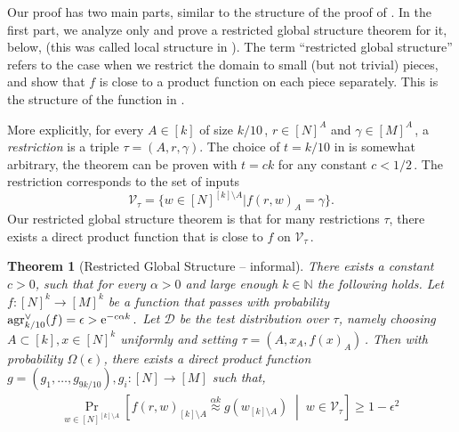 \documentclass[11pt]{article}
\numberwithin{equation}{section}
\newtheorem{theorem}{Theorem}[section]
\theoremstyle{definition}
\theoremstyle{plain}
\newcommand{\eee}{\mathrm e}
\newcommand{\Prob}[2][]{\Pr_{{#1}}\left[#2\right]} %
\newcommand{\brac}[1]{[#1]} %
\newcommand{\given}{\;\middle\vert\;} %
\newcommand\f{f} %
\newcommand{\g}{g} %
\newcommand\pf{g} %
\newcommand{\test}[2]{
	\ifx &#2&
	\textrm{agr}^{#1}
	\else	
	\textrm{agr}^{#1}_{#2}
	\fi}
\newcommand\neql[1]{\stackrel{{#1}}{ \approx}} %
\newcommand\cons{\mathcal{V}} %
\begin{document}
Our proof has two main parts, similar to the structure of the proof of \cite{dinur2008locally,impagliazzo2012new}. In the first part, we analyze only  and prove a restricted global structure theorem for it,  below, (this was called local structure in \cite{impagliazzo2012new,dinur2014direct}). The term ``restricted global structure'' refers to
the case %
when we restrict the domain to small (but not trivial) pieces, and show that $f$ is close to a product function on each piece separately. This is the structure of the function in .


More explicitly, for every $A\in[k]$ of size $k/10$\,, $r\in[N]^A$ and $\gamma\in[M]^A$\,, a \emph{restriction} is a triple $\tau = (A,r,\gamma)$. The choice of $t=k/10$ in  is somewhat arbitrary, the theorem can be proven with $t=ck$ for
any constant  %
%
%
$c < 1/2$\,.   %
The restriction corresponds to the set of inputs
%
\[\mathcal{V}_\tau = \{w\in [N]^{[k]\setminus A} | \f(r,w)_A = \gamma \}.\]
Our restricted global structure theorem is that for many restrictions $\tau$, 
there %
exists  %
a direct product function that is close to $\f$ on $\cons_{\tau}$\,.

\begin{theorem}[Restricted Global Structure -- informal] \label{thm:informal local}
	There exists a %
constant $c>0$, such that for every %
$\alpha>0$ and large enough $k\in\mathbb{N}$ the following holds.
Let $\f:[N]^k\rightarrow[M]^k$ be a function that passes  with probability  $\test{\vee}{k/10}(f)=\epsilon > \eee^{-c\alpha k}\,.$
%
%
%
Let $\mathcal{D}$ be the test distribution over $\tau$, namely choosing $A\subset[k],x\in[N]^k$ uniformly and setting $\tau=(A,x_A,\f(x)_A)$\,. Then %
%
with probability $\Omega(\epsilon)$, there exists a direct product function $\pf = (\g_1,\ldots, \g_{9k/10}), \g_i:[N]\rightarrow [M]$ such that,
	\begin{align} \label{eq:local}
	\Prob[w\in\brac{N}^{\brac{k}\setminus A}]{\f(r,w)_{[k]\setminus A} \neql{\alpha k} \pf(w_{[k]\setminus A}) \given w\in\mathcal{V}_\tau} \geq 1-\epsilon^{2 }\, %
	\end{align}
%
%
%
%
%
\end{theorem}
\end{document}
